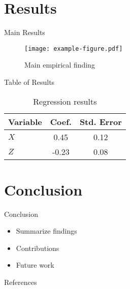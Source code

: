 \documentclass{beamer}
\begin{document}
\section{Results}

\begin{frame}{Main Results}
  \begin{figure}
    \centering
    \texttt{[image: example-figure.pdf]}
    \caption{Main empirical finding}
  \end{figure}
\end{frame}

\begin{frame}{Table of Results}
  \begin{table}
    \centering
    \begin{tabular}{lcc}
      \toprule
      Variable & Coef. & Std. Error \\
      \midrule
      $X$ & 0.45 & 0.12 \\
      $Z$ & -0.23 & 0.08 \\
      \bottomrule
    \end{tabular}
    \caption{Regression results}
  \end{table}
\end{frame}

\section{Conclusion}

\begin{frame}{Conclusion}
  \begin{itemize}
    \item Summarize findings
    \item Contributions
    \item Future work
  \end{itemize}
\end{frame}

\begin{frame}[allowframebreaks]{References}
  
  
\end{frame}
\end{document}
